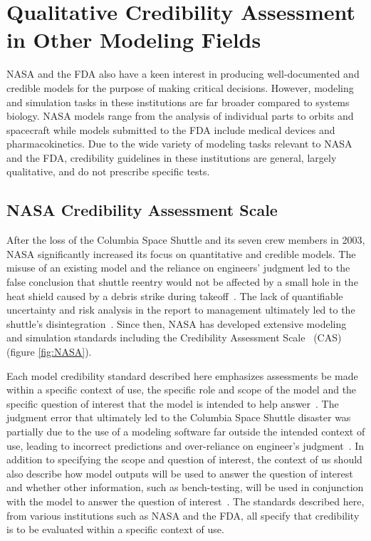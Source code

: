 \documentclass[12pt]{report}
\begin{document}
\section{Qualitative Credibility Assessment in Other Modeling Fields}
NASA and the FDA also have a keen interest in producing well-documented and credible models for the purpose of making critical decisions. However, modeling and simulation tasks in these institutions are far broader compared to systems biology. NASA models range from the analysis of individual parts to orbits and spacecraft while models submitted to the FDA include medical devices and pharmacokinetics. Due to the wide variety of modeling tasks relevant to NASA and the FDA, credibility guidelines in these institutions are general, largely qualitative, and do not prescribe specific tests.


\subsection{NASA Credibility Assessment Scale}

After the loss of the Columbia Space Shuttle and its seven crew members in 2003, NASA significantly increased its focus on quantitative and credible models. The misuse of an existing model and the reliance on engineers' judgment led to the false conclusion that shuttle reentry would not be affected by a small hole in the heat shield caused by a debris strike during takeoff~\cite{Blattnig2013-qx, Howell2021}. The lack of quantifiable uncertainty and risk analysis in the report to management ultimately led to the shuttle's disintegration~\cite{Niewoehner2008}. Since then, NASA has developed extensive modeling and simulation standards including the Credibility Assessment Scale~\cite{babula_nasa_2009} (CAS) (figure \ref{fig:NASA}).  

Each model credibility standard described here emphasizes assessments be made within a specific context of use, the specific role and scope of the model and the specific question of interest that the model is intended to help answer~\cite{FDAguidelines}. The judgment error that ultimately led to the Columbia Space Shuttle disaster was partially due to the use of a modeling software far outside the intended context of use, leading to incorrect predictions and over-reliance on engineer's judgment~\cite{Blattnig2013-qx}. In addition to specifying the scope and question of interest, the context of us should also describe how model outputs will be used to answer the question of interest and whether other information, such as bench-testing, will be used in conjunction with the model to answer the question of interest~\cite{FDAguidelines}. The standards described here, from various institutions such as NASA and the FDA, all specify that credibility is to be evaluated within a specific context of use.
\end{document}
